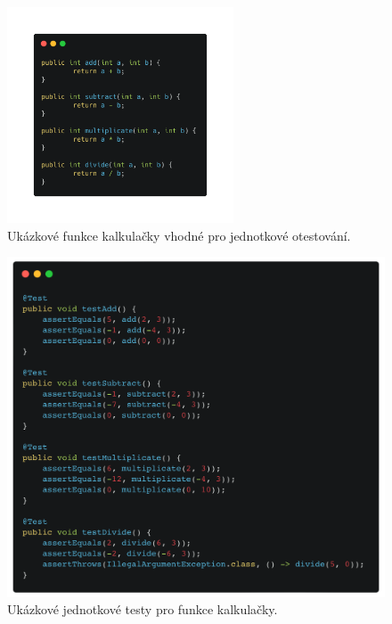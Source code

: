 \documentclass[czech, ma, kiv, he, iso690numb, pdf, viewonly]{fasthesis}
\begin{document}
    \begin{figure}[H]
        \includegraphics[width=0.6\textwidth]{pic/calc_func.png}
        \centering
        \caption{Ukázkové funkce kalkulačky vhodné pro jednotkové otestování.}
        \label{fig:calc_func}
    \end{figure}

    \begin{figure}[H]
        \includegraphics[width=\textwidth]{pic/calc_tests.png}
        \centering
        \caption{Ukázkové jednotkové testy pro funkce kalkulačky.}
        \label{fig:calc_tests}
    \end{figure}
\end{document}
